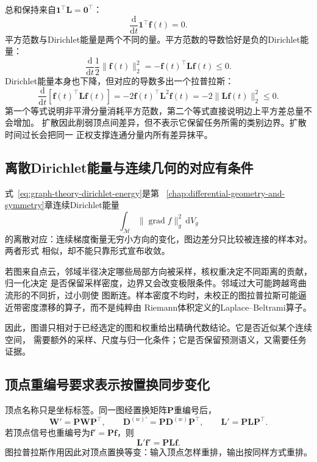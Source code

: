 总和保持来自\(\bm{1}^{\top}\bm{L}=\bm{0}^{\top}\)：
\[
  \frac{\mathrm{d}}{\mathrm{d}t}
  \bm{1}^{\top}\bm{f}(t)=0.
\]
平方范数与Dirichlet能量是两个不同的量。平方范数的导数恰好是负的Dirichlet能量：
\[
  \frac{\mathrm{d}}{\mathrm{d}t}
  \frac12\lVert\bm{f}(t)\rVert_2^2
  =
  -\bm{f}(t)^{\top}\bm{L}\bm{f}(t)
  \leq0.
\]
Dirichlet能量本身也下降，但对应的导数多出一个拉普拉斯：
\[
  \frac{\mathrm{d}}{\mathrm{d}t}
  \left[\bm{f}(t)^{\top}\bm{L}\bm{f}(t)\right]
  =
  -2\bm{f}(t)^{\top}\bm{L}^2\bm{f}(t)
  =
  -2\lVert\bm{L}\bm{f}(t)\rVert_2^2
  \leq0.
\]
第一个等式说明非平滑分量消耗平方范数，第二个等式直接说明边上平方差总量不会增加。
扩散因此削弱顶点间差异，但不表示它保留任务所需的类别边界。扩散时间过长会把同一
正权支撑连通分量内所有差异抹平。

\subsection{离散Dirichlet能量与连续几何的对应有条件}

式~\eqref{eq:graph-theory-dirichlet-energy}是第
~\ref{chap:differential-geometry-and-symmetry}章连续Dirichlet能量
\[
  \int_{\mathcal{M}}
  \lVert\operatorname{grad}f\rVert_g^2\,\mathrm{d}V_g
\]
的离散对应：连续梯度衡量无穷小方向的变化，图边差分只比较被连接的样本对。两者形式
相似，却不能只靠形式宣布收敛。

若图来自点云，邻域半径决定哪些局部方向被采样，核权重决定不同距离的贡献，归一化决定
是否保留采样密度，边界又会改变极限条件。邻域过大可能跨越弯曲流形的不同折，过小则使
图断连。样本密度不均时，未校正的图拉普拉斯可能逼近带密度漂移的算子，而不是纯粹由
Riemann体积定义的Laplace--Beltrami算子。

因此，图谱只相对于已经选定的图和权重给出精确代数结论。它是否近似某个连续空间，
需要额外的采样、尺度与归一化条件；它是否保留预测语义，又需要任务证据。

\subsection{顶点重编号要求表示按置换同步变化}

顶点名称只是坐标标签。同一图经置换矩阵\(\bm{P}\)重编号后，
\[
  \bm{W}'=\bm{P}\bm{W}\bm{P}^{\top},
  \qquad
  \bm{D}^{(w)\prime}=\bm{P}\bm{D}^{(w)}\bm{P}^{\top},
  \qquad
  \bm{L}'=\bm{P}\bm{L}\bm{P}^{\top}.
  \label{eq:graph-theory-laplacian-relabel}
\]
若顶点信号也重编号为\(\bm{f}'=\bm{P}\bm{f}\)，则
\[
  \bm{L}'\bm{f}'=\bm{P}\bm{L}\bm{f}.
\]
图拉普拉斯作用因此对顶点置换等变：输入顶点怎样重排，输出按同样方式重排。

